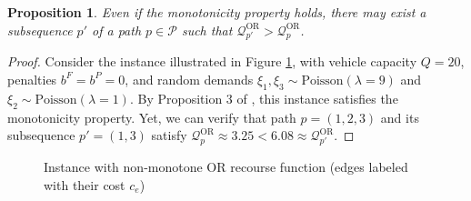 \documentclass{article}
\newtheorem{proposition}{Proposition}
\newcommand{\rev}[1]{{\color{black}#1}}
\begin{document}
\begin{proposition}\label{prop:OR_non_monotonic_subseq}
Even if the monotonicity property holds, there may exist a subsequence $p'$ of a path $p \in \mathcal{P}$ such that $\mathcal{Q}^{\text{OR}}_{p'} > \mathcal{Q}^{\text{OR}}_{p}$.
\end{proposition}
\begin{proof} 
Consider the instance illustrated in Figure \ref{fig:non_monotonic_recourse}, with vehicle capacity $Q=20$, penalties $b^F=b^P=0$, and random demands $\xi_1,\xi_3 \sim \text{Poisson}(\lambda=9)$ and $\xi_2 \sim \text{Poisson}(\lambda=1)$. By Proposition 3 of \cite{parada2024disaggregated}, this instance satisfies the monotonicity property. Yet, we can verify that path $p=(1,2,3)$ and its subsequence $p'=(1,3)$ satisfy $\mathcal{Q}^{\text{OR}}_p \approx 3.25 < 6.08 \approx \mathcal{Q}^{\text{OR}}_{p'}$.
\end{proof}

\begin{figure}[H]
  \centering
  \caption{Instance with non-monotone OR recourse function \rev{(edges labeled with their cost $c_e$)}}
  \label{fig:non_monotonic_recourse}
\end{figure}
\end{document}
